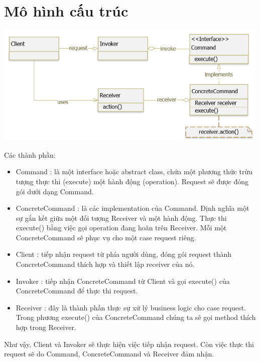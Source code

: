 \section{Mô hình cấu trúc}
\begin{center}
\includegraphics{GALLEYS/images/chapter7/diagram}
\end{center}
Các thành phần:
\begin{itemize}
\item Command : là một interface hoặc abstract class, chứa một phương thức trừu tượng thực thi (execute) một hành động (operation). Request sẽ được đóng gói dưới dạng Command.
\item ConcreteCommand : là các implementation của Command. Định nghĩa một sự gắn kết giữa một đối tượng Receiver và một hành động. Thực thi execute() bằng việc gọi operation đang hoãn trên Receiver. Mỗi một ConcreteCommand sẽ phục vụ cho một case request riêng.
\item Client : tiếp nhận request từ phía người dùng, đóng gói request thành ConcreteCommand thích hợp và thiết lập receiver của nó.
\item Invoker : tiếp nhận ConcreteCommand từ Client và gọi execute() của ConcreteCommand để thực thi request.
\item Receiver : đây là thành phần thực sự xử lý business logic cho case request. Trong phương execute() của ConcreteCommand chúng ta sẽ gọi method thích hợp trong Receiver.
\end{itemize}
Như vậy, Client và Invoker sẽ thực hiện việc tiếp nhận request. Còn việc thực thi request sẽ do Command, ConcreteCommand và Receiver đảm nhận.\\


